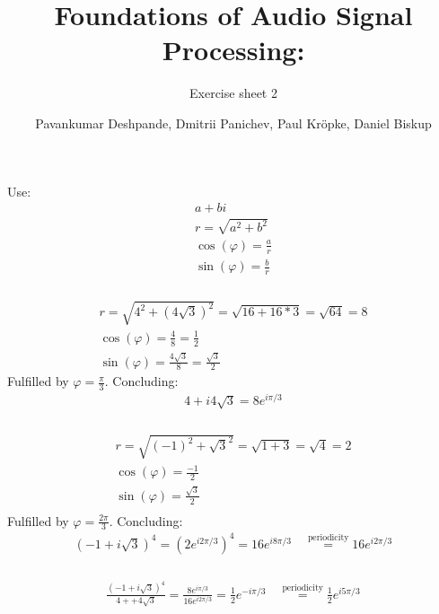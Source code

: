 \documentclass[11pt,a4paper]{scrartcl}
\begin{document}
\author{Pavankumar Deshpande, Dmitrii Panichev, Paul Kröpke, Daniel Biskup}
\title{Foundations of Audio Signal Processing:}
\subtitle{Exercise sheet 2}
\maketitle

\setcounter{section}{3} %
\subsection{} %
Use:
\begin{align}
a+bi\\
r=\sqrt{a^2+b^2}\\
\cos(\varphi)=\frac{a}{r}\\
\sin(\varphi)=\frac{b}{r}
\end{align}
\subsubsection{} %
\begin{align}
r=\sqrt{4^2+(4\sqrt{3})^2}=\sqrt{16+16*3}=\sqrt{64}=8\\
\cos(\varphi)=\frac{4}{8}=\frac{1}{2}\\
\sin(\varphi)=\frac{4\sqrt{3}}{8}=\frac{\sqrt{3}}{2}
\end{align}
Fulfilled by $\varphi = \frac{\pi}{3}$. Concluding: 
\begin{align}
4+i4\sqrt{3} = 8e^{i\pi/3}
\end{align}

\subsubsection{} %
\begin{align}
r=\sqrt{(-1)^2+\sqrt{3}^2}=\sqrt{1+3}=\sqrt{4}=2\\
\cos(\varphi)=\frac{-1}{2}\\
\sin(\varphi)=\frac{\sqrt{3}}{2}\\
\end{align}
Fulfilled by $\varphi = \frac{2\pi}{3}$. Concluding: 
\begin{align}
(-1+i\sqrt{3})^4= (2e^{i2\pi/3})^4=16e^{i8\pi/3}\quad\overset{\text{periodicity}}{=}16e^{i2\pi/3}
\end{align}

\subsubsection{} %
\begin{align}
\frac{(-1+i\sqrt{3})^4}{4++4\sqrt{3}}=\frac{8e^{i\pi/3}}{16e^{i2\pi/3}}=\frac{1}{2}e^{-i\pi/3}\quad\overset{\text{periodicity}}{=}\frac{1}{2}e^{i5\pi/3}
\end{align}
\end{document}
